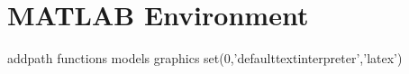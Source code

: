 
\chapter{MATLAB Environment}
\label{app:Matlab_environement}

\begin{MATLAB}
% 
% 

addpath functions models graphics %
set(0,'defaulttextinterpreter','latex') %
% 
% 
% 
% 
% 
% 
% 


\end{MATLAB}
